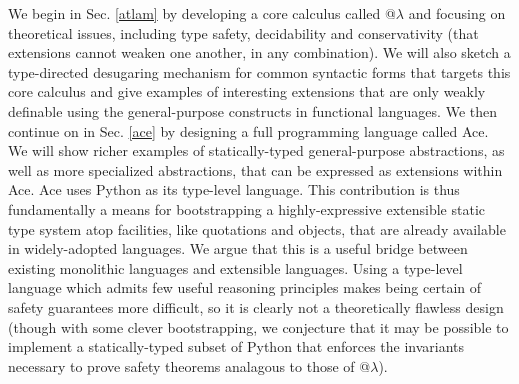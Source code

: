 

We begin in Sec. \ref{atlam} by developing a core calculus called @$\lambda$ and focusing on theoretical issues, including type safety, decidability and {conservativity} (that extensions cannot weaken one another, in any combination). We will also sketch a type-directed desugaring mechanism for common syntactic forms that targets this core calculus and give examples of interesting extensions that are only weakly definable using the general-purpose constructs in functional languages. We then continue on in Sec. \ref{ace} by designing a full programming language called Ace. We will show richer examples of statically-typed general-purpose abstractions, as well as more specialized abstractions, that can be expressed as extensions within Ace. Ace  uses Python as its type-level language. This contribution is thus fundamentally a means for bootstrapping a highly-expressive extensible static type system atop facilities, like quotations and objects, that are already available in widely-adopted languages. We argue that this is a useful bridge between existing monolithic languages and extensible languages. Using a type-level language which admits few useful reasoning principles makes being certain of safety guarantees more difficult, so it is clearly not a theoretically flawless design (though with some clever bootstrapping, we conjecture that it may be possible to implement a statically-typed subset of Python that enforces the invariants necessary to prove safety theorems analagous to those of @$\lambda$).

